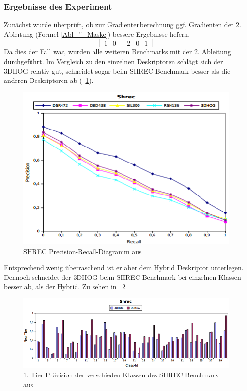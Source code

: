 \subsubsection{Ergebnisse des Experiment}
Zunächst wurde überprüft, ob zur Gradientenberechnung ggf. Gradienten der 2. Ableitung (Formel \ref{Abl_''_Maske}) bessere Ergebnisse liefern.    
\begin{equation}
\label{Abl_''_Maske}
\begin{bmatrix}
1 & 0 & -2 & 0 & 1
\end{bmatrix}
\end{equation}
Da dies der Fall war, wurden alle weiteren Benchmarks mit der 2. Ableitung durchgeführt. Im Vergleich zu den einzelnen Deskriptoren schlägt sich der 3DHOG relativ gut, schneidet sogar beim SHREC Benchmark besser als die anderen Deskriptoren ab (\figurename~\ref{Shrec_diag}).

 \begin{figure}[thpb]
 	\centering
 	\includegraphics[width=\linewidth]{2-Hauptteil/pics/SHREC_diag.png}
 	\caption{SHREC Precision-Recall-Diagramm aus \cite{scherer2010histograms}}
 	\label{Shrec_diag}
 \end{figure}
 
 Entsprechend wenig überraschend ist er aber dem Hybrid Deskriptor unterlegen. Dennoch schneidet der 3DHOG beim SHREC Benchmark bei einzelnen Klassen besser ab, als der Hybrid. Zu sehen in \figurename~\ref{SHREC_3DHOG_DSR472} 

 \begin{figure}[thpb]
 	\centering
 	\includegraphics[width=\linewidth]{2-Hauptteil/pics/SHREC_3DHOG_DSR472.png}
 	\caption{1. Tier Präzision der verschieden Klassen des SHREC Benchmark aus \cite{scherer2010histograms}}
 	\label{SHREC_3DHOG_DSR472}
 \end{figure}
 

